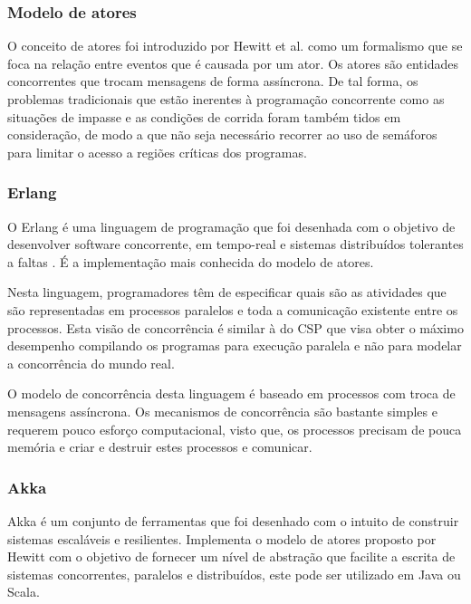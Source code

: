 \subsubsection{Modelo de atores}
\label{sec:actors}
O conceito de atores foi introduzido por Hewitt et al. \cite{Hewitt:StructuresAsPatternsOfPassingMessages} como um formalismo que se foca na relação entre eventos que é causada por um ator. Os atores são entidades concorrentes que trocam mensagens de forma assíncrona. De tal forma, os problemas tradicionais que estão inerentes à programação concorrente como as situações de impasse e as condições de corrida foram também tidos em consideração, de modo a que não seja necessário recorrer ao uso de semáforos para limitar o acesso a regiões críticas dos programas. %

\subsubsection{Erlang}
O Erlang é uma linguagem de programação que foi desenhada com o objetivo de desenvolver software concorrente, em tempo-real e sistemas distribuídos tolerantes a faltas \cite{Armstrong:ErlangBook}. É a implementação mais conhecida do modelo de atores.

Nesta linguagem, programadores têm de especificar quais são as atividades que são representadas em processos paralelos e toda a comunicação existente entre os processos. Esta visão de concorrência é similar à do CSP \cite{Hoare:CSP} que visa obter o máximo desempenho compilando os programas para execução paralela e não para modelar a concorrência do mundo real.

O modelo de concorrência desta linguagem é baseado em processos com troca de mensagens assíncrona. Os mecanismos de concorrência são bastante simples e requerem pouco esforço computacional, visto que, os processos precisam de pouca memória e criar e destruir estes processos e comunicar.

\subsubsection{Akka}

Akka é um conjunto de ferramentas que foi desenhado com o intuito de construir sistemas escaláveis e resilientes.
Implementa o modelo de atores proposto por Hewitt  \cite{Hewitt:ActorFormalismForAI} com o objetivo de fornecer um nível de abstração que facilite a escrita de sistemas concorrentes, paralelos e distribuídos, este pode ser utilizado em Java ou Scala.

